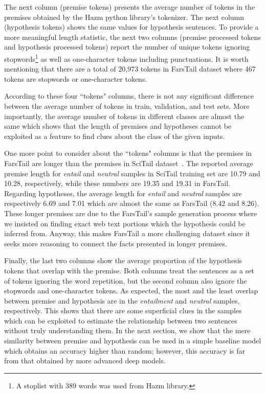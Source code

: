 \documentclass[preprint,12pt]{elsarticle}
\begin{document}
The next column (premise tokens) presents the average number of tokens in the premises obtained by the Hazm python library's tokenizer. The next column (hypothesis tokens) shows the same values for hypothesis sentences. To provide a more meaningful length statistic, the next two columns (premise processed tokens and hypothesis processed tokens) report the number of unique tokens ignoring stopwords\footnote{A stoplist with 389 words was used from Hazm library.} as well as one-character tokens including punctuations. It is worth mentioning that there are a total of 20,973 tokens in FarsTail dataset where 467 tokens are stopwords or one-character tokens. 

According to these four ``tokens" columns, there is not any significant difference between the average number of tokens in train, validation, and test sets. More importantly, the average number of tokens in different classes are almost the same which shows that the length of premises and hypotheses cannot be exploited as a feature to find clues about the class of the given inputs. 

One more point to consider about the ``tokens" columns is that the premises in FarsTail are longer than the premises in SciTail dataset~\citep{khot2018scitail}. The reported average premise length for \textit{entail} and \textit{neutral} samples in SciTail training set are 10.79 and 10.28, respectively, while these numbers are 19.35 and 19.31 in FarsTail. Regarding hypotheses, the average length for \textit{entail} and \textit{neutral} samples are respectively 6.69 and 7.01 which are almost the same as FarsTail (8.42 and 8.26). These longer premises are due to the FarsTail's sample generation process where we insisted on finding exact web text portions which the hypothesis could be inferred from. Anyway, this makes FarsTail a more challenging dataset since it seeks more reasoning to connect the facts presented in longer premises. 

Finally, the last two columns show the average proportion of the hypothesis tokens that overlap with the premise. Both columns treat the sentences as a set of tokens ignoring the word repetition, but the second column also ignore the stopwords and one-character tokens. As expected, the most and the least overlap between premise and hypothesis are in the \textit{entailment} and \textit{neutral} samples, respectively. This shows that there are some superficial clues in the samples which can be exploited to estimate the relationship between two sentences without truly understanding them. In the next section, we show that the mere similarity between premise and hypothesis can be used in a simple baseline model which obtains an accuracy higher than random; however, this accuracy is far from that obtained by more advanced deep models.
\end{document}
